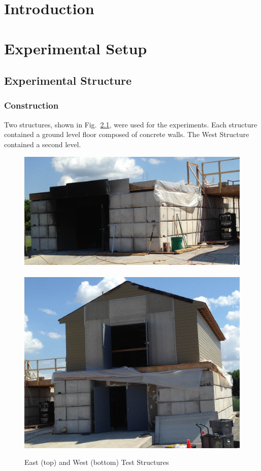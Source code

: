 \documentclass[12pt,oneside]{book}
\begin{document}
\mainmatter

\chapter{Introduction}
\label{chap:Introduction}

\chapter{Experimental Setup}
\label{chap:Experimental_Setup}

\section{Experimental Structure}
\label{sec:Experimental_Structure}

\subsection{Construction}
\label{sec:Construction}
Two structures, shown in Fig.~\ref{fig:struct_pics}, were used for the experiments. Each structure contained a ground level floor composed of concrete walls. The West Structure contained a second level.

\begin{figure}[!ht]
\includegraphics[width=6in]{../../Figures/east_structure}
\\~\\
\includegraphics[width=6in]{../../Figures/west_structure}
\caption{East (top) and West (bottom) Test Structures}
\label{fig:struct_pics}
\end{figure}
\end{document}
